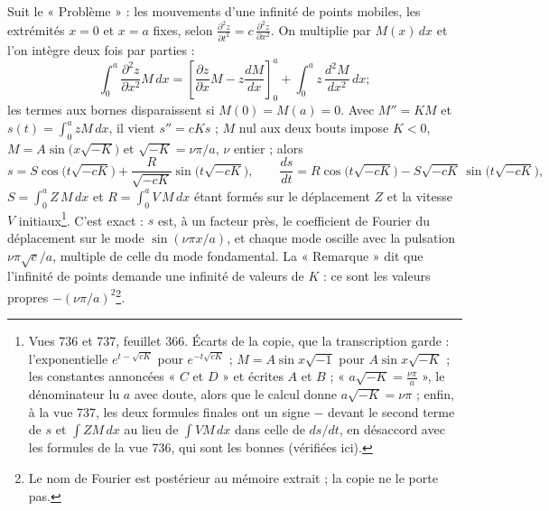 \documentclass[11pt,a4paper]{article}
\begin{document}
Suit le « Problème » : les mouvements d'une infinité de points mobiles, les extrémités $x=0$ et $x=a$ fixes, selon $\frac{\partial^2z}{\partial t^2}=c\,\frac{\partial^2z}{\partial x^2}$. On multiplie par $M(x)\,dx$ et l'on intègre deux fois par parties :
\[ \int_0^a\frac{\partial^2z}{\partial x^2}M\,dx=\left[\frac{\partial z}{\partial x}M-z\frac{dM}{dx}\right]_0^a+\int_0^a z\,\frac{d^2M}{dx^2}\,dx ; \]
les termes aux bornes disparaissent si $M(0)=M(a)=0$. Avec $M''=KM$ et $s(t)=\int_0^a zM\,dx$, il vient $s''=cKs$ ; $M$ nul aux deux bouts impose $K<0$, $M=A\sin\bigl(x\sqrt{-K}\bigr)$ et $\sqrt{-K}=\nu\pi/a$, $\nu$ entier ; alors
\[ s=S\cos\bigl(t\sqrt{-cK}\bigr)+\frac{R}{\sqrt{-cK}}\sin\bigl(t\sqrt{-cK}\bigr),\qquad \frac{ds}{dt}=R\cos\bigl(t\sqrt{-cK}\bigr)-S\sqrt{-cK}\,\sin\bigl(t\sqrt{-cK}\bigr), \]
$S=\int_0^a Z\,M\,dx$ et $R=\int_0^a V\,M\,dx$ étant formés sur le déplacement $Z$ et la vitesse $V$ initiaux\footnote{Vues 736 et 737, feuillet 366. Écarts de la copie, que la transcription garde : l'exponentielle $e^{t-\sqrt{cK}}$ pour $e^{-t\sqrt{cK}}$ ; $M=A\sin x\sqrt{-1}$ pour $A\sin x\sqrt{-K}$ ; les constantes annoncées « $C$ et $D$ » et écrites $A$ et $B$ ; « $a\sqrt{-K}=\frac{\nu\pi}{a}$ », le dénominateur lu $a$ avec doute, alors que le calcul donne $a\sqrt{-K}=\nu\pi$ ; enfin, à la vue 737, les deux formules finales ont un signe $-$ devant le second terme de $s$ et $\int ZM\,dx$ au lieu de $\int VM\,dx$ dans celle de $ds/dt$, en désaccord avec les formules de la vue 736, qui sont les bonnes (vérifiées ici).}. C'est exact : $s$ est, à un facteur près, le coefficient de Fourier du déplacement sur le mode $\sin(\nu\pi x/a)$, et chaque mode oscille avec la pulsation $\nu\pi\sqrt c/a$, multiple de celle du mode fondamental. La « Remarque » dit que l'infinité de points demande une infinité de valeurs de $K$ : ce sont les valeurs propres $-(\nu\pi/a)^2$\footnote{Le nom de Fourier est postérieur au mémoire extrait ; la copie ne le porte pas.}.
\end{document}
